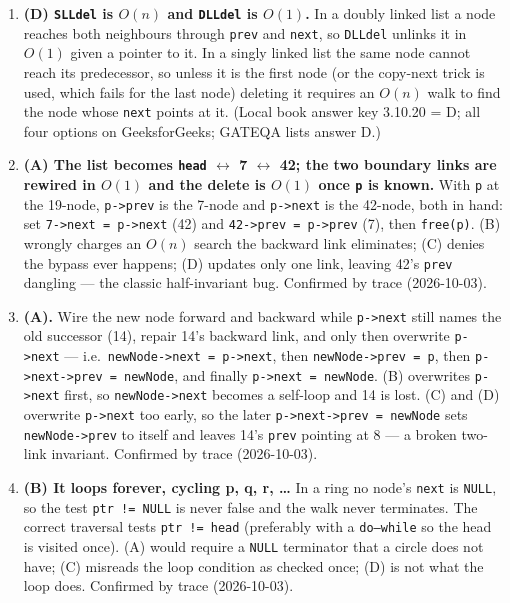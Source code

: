 \documentclass[11pt]{article}
\begin{document}
\begin{enumerate}
\item[\textbf{Q5}] \textbf{(D) \texttt{SLLdel} is $O(n)$ and \texttt{DLLdel} is $O(1)$.} In a doubly linked list a node reaches both neighbours through \texttt{prev} and \texttt{next}, so \texttt{DLLdel} unlinks it in $O(1)$ given a pointer to it. In a singly linked list the same node cannot reach its predecessor, so unless it is the first node (or the copy-next trick is used, which fails for the last node) deleting it requires an $O(n)$ walk to find the node whose \texttt{next} points at it. (Local book answer key 3.10.20 = D; all four options on GeeksforGeeks; GATEQA lists answer D.)

\item[\textbf{Q6}] \textbf{(A) The list becomes \texttt{head} $\leftrightarrow$ 7 $\leftrightarrow$ 42; the two boundary links are rewired in $O(1)$ and the delete is $O(1)$ once \texttt{p} is known.} With \texttt{p} at the 19-node, \texttt{p->prev} is the 7-node and \texttt{p->next} is the 42-node, both in hand: set \texttt{7->next = p->next} (42) and \texttt{42->prev = p->prev} (7), then \texttt{free(p)}. (B) wrongly charges an $O(n)$ search the backward link eliminates; (C) denies the bypass ever happens; (D) updates only one link, leaving 42's \texttt{prev} dangling --- the classic half-invariant bug. Confirmed by trace (2026-10-03).

\item[\textbf{Q7}] \textbf{(A).} Wire the new node forward and backward while \texttt{p->next} still names the old successor (14), repair 14's backward link, and only then overwrite \texttt{p->next} --- i.e.\ \texttt{newNode->next = p->next}, then \texttt{newNode->prev = p}, then \texttt{p->next->prev = newNode}, and finally \texttt{p->next = newNode}. (B) overwrites \texttt{p->next} first, so \texttt{newNode->next} becomes a self-loop and 14 is lost. (C) and (D) overwrite \texttt{p->next} too early, so the later \texttt{p->next->prev = newNode} sets \texttt{newNode->prev} to itself and leaves 14's \texttt{prev} pointing at 8 --- a broken two-link invariant. Confirmed by trace (2026-10-03).

\item[\textbf{Q8}] \textbf{(B) It loops forever, cycling p, q, r, \dots} In a ring no node's \texttt{next} is \texttt{NULL}, so the test \texttt{ptr != NULL} is never false and the walk never terminates. The correct traversal tests \texttt{ptr != head} (preferably with a \texttt{do--while} so the head is visited once). (A) would require a \texttt{NULL} terminator that a circle does not have; (C) misreads the loop condition as checked once; (D) is not what the loop does. Confirmed by trace (2026-10-03).


\end{enumerate}
\end{document}
